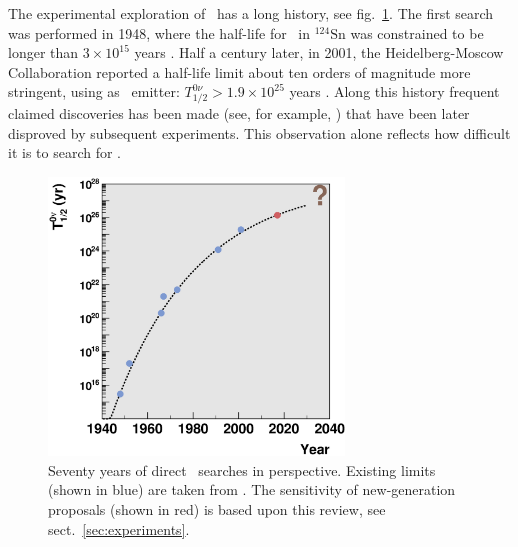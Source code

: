 

The experimental exploration of \bbonu\ has a long history, see fig.~\ref{fig:bb0nusearches}. The first search was performed in 1948, where the half-life for \bbonu\ in $^{124}\text{Sn}$ was constrained to be longer than $3\times 10^{15}$ years \cite{Barabash:2011mf}. Half a century later, in 2001, the Heidelberg-Moscow Collaboration reported a half-life limit about ten orders of magnitude more stringent, using  as \bb\ emitter: $T_{1/2}^{0\nu}>1.9\times 10^{25}$ years \cite{Klapdor-Kleingrothaus:2000eir}. Along this history frequent claimed discoveries has been made (see, for example, \cite{Tretyak:2011pg}) that have been later disproved by subsequent experiments. This observation alone reflects how difficult it is to search for \bbonu.

\begin{figure}[t!b!]
\begin{center}
\includegraphics[width=0.70\textwidth]{img/bb0nusearches.eps}
\end{center}
\caption{Seventy years of direct \bbonu\ searches in perspective. Existing limits (shown in blue) are taken from \cite{Barabash:2011mf}. The sensitivity of new-generation proposals (shown in red) is based upon this review, see sect.~\ref{sec:experiments}.} \label{fig:bb0nusearches}
\end{figure}

